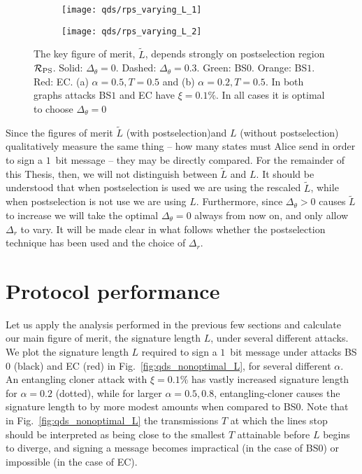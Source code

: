 \begin{figure}[htp]
\captionsetup{width=0.8\linewidth}
\centering
	\begin{subfigure}{0.7\linewidth}
		\centering
		\caption{}
		\texttt{[image: qds/rps\_varying\_L\_1]}
	\end{subfigure}
	\begin{subfigure}{0.7\linewidth}
		\centering
		\caption{}
		\texttt{[image: qds/rps\_varying\_L\_2]}
	\end{subfigure}
\caption{\label{fig:qds_L_vs_deltar} The key figure of merit, $\tilde{L}$, depends strongly on postselection region $\mathcal{R}_{\text{PS}}$. Solid: $\Delta_\theta=0$. Dashed: $\Delta_\theta = 0.3$. Green: BS$0$. Orange: BS$1$. Red: EC. (a) $\alpha = 0.5, T = 0.5$ and (b) $\alpha=0.2, T=0.5$. In both graphs attacks BS$1$ and EC have $\xi = 0.1 \%$. In all cases it is optimal to choose $\Delta_\theta = 0$}
\end{figure}

Since the figures of merit $\tilde{L}$ (with postselection)and $L$ (without postselection) qualitatively measure the same thing -- how many states must Alice send in order to sign a $1$~bit message -- they may be directly compared. For the remainder of this Thesis, then, we will not distinguish between $\tilde{L}$ and $L$. It should be understood that when postselection is used we are using the rescaled $\tilde{L}$, while when postselection is not use we are using $L$. Furthermore, since $\Delta_\theta > 0$ causes $\tilde{L}$ to increase we will take the optimal $\Delta_\theta=0$ always from now on, and only allow $\Delta_r$ to vary. It will be made clear in what follows whether the postselection technique has been used and the choice of $\Delta_r$.



\section{Protocol performance}\label{sec:qds_protocol_performance}
Let us apply the analysis performed in the previous few sections and calculate our main figure of merit, the signature length $L$, under several different attacks. We plot the signature length $L$ required to sign a $1$~bit message under attacks BS$0$ (black) and EC (red) in Fig.~\ref{fig:qds_nonoptimal_L}, for several different $\alpha$. An entangling cloner attack with $\xi = 0.1\%$ has vastly increased signature length for $\alpha=0.2$ (dotted), while for larger $\alpha=0.5, 0.8$, entangling-cloner causes the signature length to by more modest amounts when compared to BS$0$. Note that in Fig.~\ref{fig:qds_nonoptimal_L} the transmissions $T$ at which the lines stop should be interpreted as being close to the smallest $T$ attainable before $L$ begins to diverge, and signing a message becomes impractical (in the case of BS$0$) or impossible (in the case of EC). 






